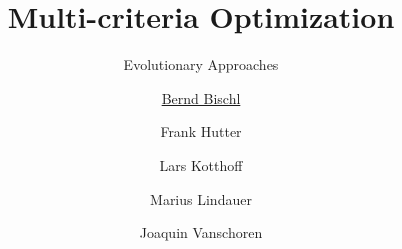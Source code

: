 


\newcommand{\q}[0]{\mathbf{q}}

\newcommand{\xx}{\conf} %
\newcommand{\xxi}[1][i]{\lambda_{#1}} %
\newcommand{\XX}{\pcs} %
\newcommand{\f}{\cost} %

\title[AutoML: Overview]{Multi-criteria Optimization}
\subtitle{Evolutionary Approaches}
\author[Bernd Bischl]{\underline{Bernd Bischl} \and Frank Hutter \and Lars Kotthoff\newline \and Marius Lindauer \and Joaquin Vanschoren}
\institute{}
\date{}






	\maketitle




